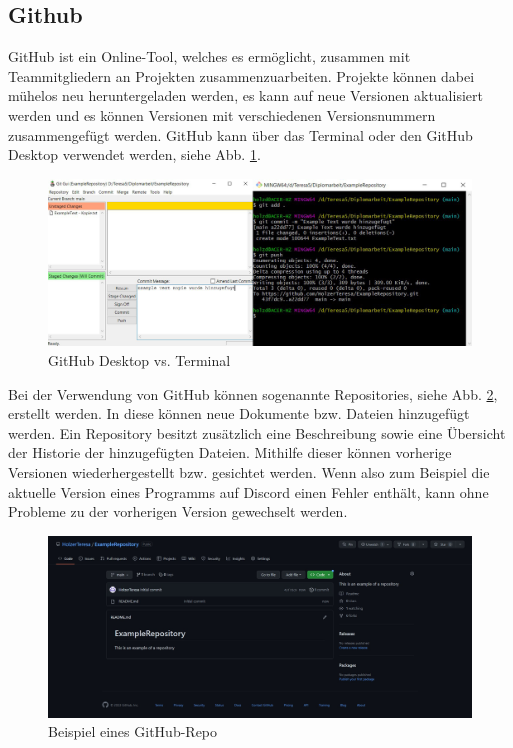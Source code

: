\subsection{Github} 
GitHub ist ein Online-Tool, welches es ermöglicht, zusammen mit Teammitgliedern an Projekten zusammenzuarbeiten. Projekte können dabei mühelos neu heruntergeladen werden, es kann auf neue Versionen aktualisiert werden und es können Versionen mit verschiedenen Versionsnummern zusammengefügt werden. GitHub kann über das Terminal oder den GitHub Desktop verwendet werden, siehe Abb. \ref{fig:impl:gitHubTerminalVSGUI}.


\begin{figure}[h t]
\centering
\includegraphics[scale=0.45]{pics/githubTerminalGUI.png}
\caption{GitHub Desktop vs. Terminal}
\label{fig:impl:gitHubTerminalVSGUI}
\end{figure}


Bei der Verwendung von GitHub können sogenannte Repositories, siehe Abb. \ref{fig:impl:githubRepository}, erstellt werden. In diese können neue Dokumente bzw. Dateien hinzugefügt werden. Ein Repository besitzt zusätzlich eine Beschreibung sowie eine Übersicht der Historie der hinzugefügten Dateien. Mithilfe dieser können vorherige Versionen wiederhergestellt bzw. gesichtet werden. Wenn also zum Beispiel die aktuelle Version eines Programms auf Discord einen Fehler enthält, kann ohne Probleme zu der vorherigen Version gewechselt werden.




\begin{figure}[h t]
\centering
\includegraphics[scale=0.38]{pics/exampleRepository.jpg}
\caption{Beispiel eines GitHub-Repo}
\label{fig:impl:githubRepository}
\end{figure}

